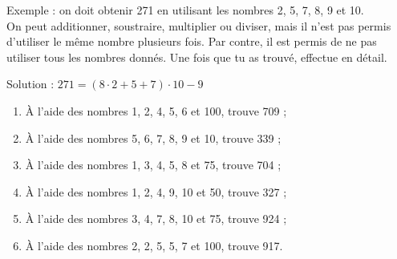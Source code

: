 \begin{exercice}
Exemple : on doit obtenir 271 en utilisant les nombres 2, 5, 7, 8, 9 et 10. \\[0.75em]
On peut additionner, soustraire, multiplier ou diviser, mais il n’est pas permis d’utiliser le même nombre plusieurs fois. Par contre, il est permis de ne pas utiliser tous les nombres donnés. Une fois que tu as trouvé, effectue en détail.
\begin{center} Solution : $271 = (8 \cdot 2 + 5 + 7) \cdot 10 - 9$ \end{center}
\begin{enumerate}
 \item À l'aide des nombres 1, 2, 4, 5, 6 et 100, trouve 709 ;
 \item À l'aide des nombres 5, 6, 7, 8, 9 et 10, trouve 339 ;
 \item À l'aide des nombres 1, 3, 4, 5, 8 et 75, trouve 704 ;
 \item À l'aide des nombres 1, 2, 4, 9, 10 et 50, trouve 327 ;
 \item À l'aide des nombres 3, 4, 7, 8, 10 et 75, trouve 924 ;
 \item À l'aide des nombres 2, 2, 5, 5, 7 et 100, trouve 917.
 \end{enumerate}
\end{exercice}
